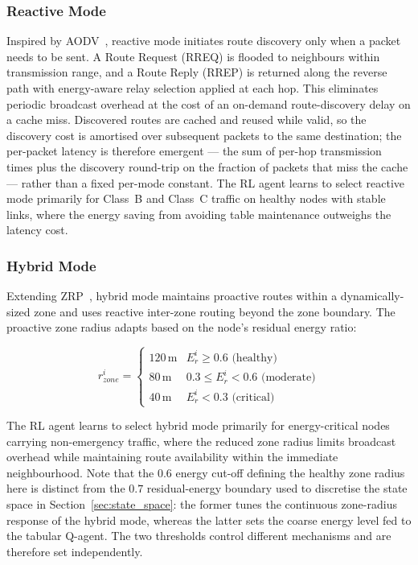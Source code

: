 \documentclass[12pt]{article}
\begin{document}
\subsubsection{Reactive Mode}\label{sec:reactive}
Inspired by AODV~\cite{perkins1999}, reactive mode initiates route
discovery only when a packet needs to be sent. A Route Request (RREQ)
is flooded to neighbours within transmission range, and a Route Reply
(RREP) is returned along the reverse path with energy-aware relay
selection applied at each hop. This
eliminates periodic broadcast overhead at the cost of an on-demand
route-discovery delay on a cache miss. Discovered routes are cached and
reused while valid, so the discovery cost is amortised over subsequent
packets to the same destination; the per-packet latency is therefore emergent
--- the sum of per-hop transmission times plus the discovery round-trip on the
fraction of packets that miss the cache --- rather than a fixed per-mode
constant.
The RL agent learns to select reactive mode primarily for Class~B and
Class~C traffic on healthy nodes with stable links, where the energy
saving from avoiding table maintenance outweighs the latency cost.

\subsubsection{Hybrid Mode}\label{sec:hybrid}
Extending ZRP~\cite{haas2001}, hybrid mode maintains proactive routes
within a dynamically-sized zone and uses reactive inter-zone routing
beyond the zone boundary. The proactive zone radius adapts based on
the node's residual energy ratio:

\begin{equation}
r_{zone}^i = \begin{cases}
120\,\text{m} & E_r^i \geq 0.6 \text{ (healthy)} \\
80\,\text{m}  & 0.3 \leq E_r^i < 0.6 \text{ (moderate)} \\
40\,\text{m}  & E_r^i < 0.3 \text{ (critical)}
\end{cases}
\label{eq:zone}
\end{equation}

The RL agent learns to select hybrid mode primarily for energy-critical
nodes carrying non-emergency traffic, where the reduced zone radius limits
broadcast overhead while maintaining route availability within the immediate
neighbourhood. Note that the $0.6$ energy cut-off defining the healthy zone
radius here is distinct from the $0.7$ residual-energy boundary used to
discretise the state space in Section~\ref{sec:state_space}: the former tunes
the continuous zone-radius response of the hybrid mode, whereas the latter sets
the coarse energy level fed to the tabular Q-agent. The two thresholds control
different mechanisms and are therefore set independently.
\end{document}

